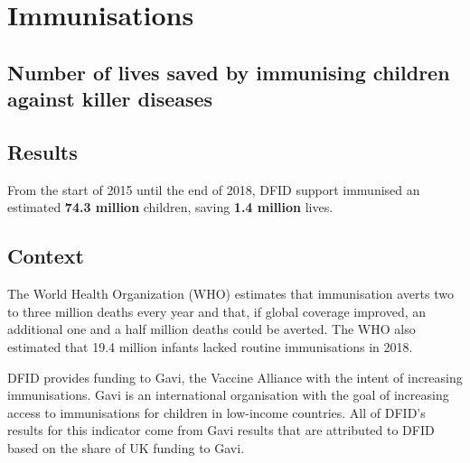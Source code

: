 \chapter{Immunisations}

\section*{Number of lives saved by immunising children against killer diseases}

\bigskip
\bigskip

\thispagestyle{empty}


\section{Results}
From the start of 2015 until the end of 2018, DFID support immunised an estimated \textbf{74.3 million} children, saving \textbf{1.4 million} lives. %


\section{Context}

The World Health Organization (WHO) estimates that immunisation averts two to three million deaths every year and that, if global coverage improved, an additional one and a half million deaths could be averted. %
The WHO also estimated that 19.4 million infants lacked routine immunisations in 2018\footnotemark. \\%


DFID provides funding to Gavi, the Vaccine Alliance with the intent of increasing immunisations. %
Gavi is an international organisation with the goal of increasing access to immunisations for children in low-income countries. %
All of DFID's results for this indicator come from Gavi results that are attributed to DFID based on the share of UK funding to Gavi. %

\newpage
